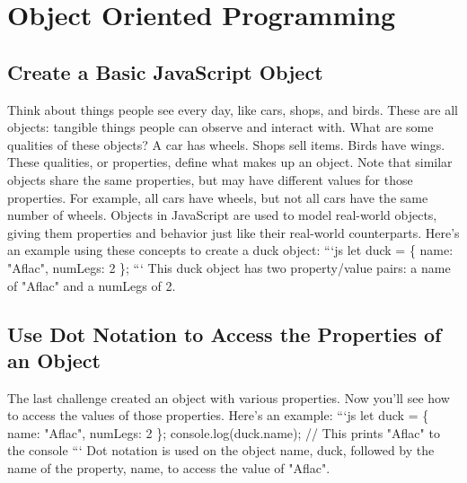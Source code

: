 \documentclass{article}%
\begin{document}
%
\newpage%
\section{Object Oriented Programming}%
\label{sec:ObjectOrientedProgramming}%
\subsection{Create a Basic JavaScript Object}%
\label{subsec:CreateaBasicJavaScriptObject}%
Think about things people see every day, like cars, shops, and birds. These are all objects: tangible things people can observe and interact with.\newline%
What are some qualities of these objects? A car has wheels. Shops sell items. Birds have wings.\newline%
These qualities, or properties, define what makes up an object. Note that similar objects share the same properties, but may have different values for those properties. For example, all cars have wheels, but not all cars have the same number of wheels.\newline%
Objects in JavaScript are used to model real{-}world objects, giving them properties and behavior just like their real{-}world counterparts. Here's an example using these concepts to create a duck object:\newline%
```js\newline%
let duck = \{\newline%
  name: "Aflac",\newline%
  numLegs: 2\newline%
\};\newline%
```\newline%
This duck object has two property/value pairs: a name of "Aflac" and a numLegs of 2.\newline%

%
\subsection{Use Dot Notation to Access the Properties of an Object}%
\label{subsec:UseDotNotationtoAccessthePropertiesofanObject}%
The last challenge created an object with various properties. Now you'll see how to access the values of those properties. Here's an example:\newline%
```js\newline%
let duck = \{\newline%
  name: "Aflac",\newline%
  numLegs: 2\newline%
\};\newline%
console.log(duck.name);\newline%
// This prints "Aflac" to the console\newline%
```\newline%
Dot notation is used on the object name, duck, followed by the name of the property, name, to access the value of "Aflac".\newline%
\end{document}
